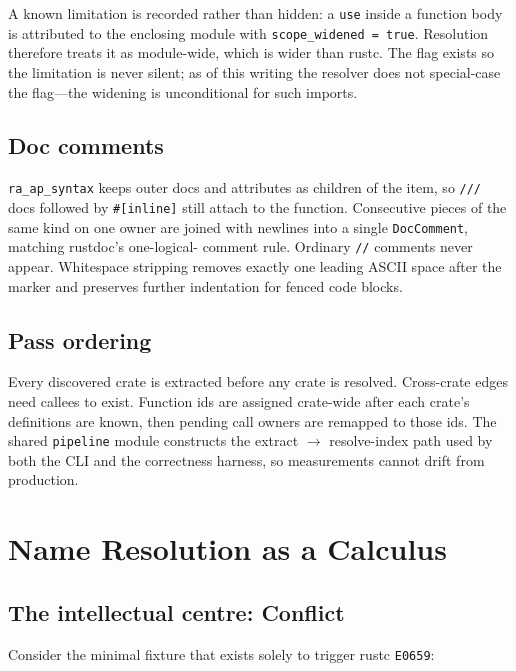 \documentclass[11pt,a4paper,oneside]{report}
\begin{document}
A known limitation is recorded rather than hidden: a \texttt{use} inside a
function body is attributed to the enclosing module with
\texttt{scope\_widened = true}. Resolution therefore treats it as module-wide,
which is wider than rustc. The flag exists so the limitation is never silent;
as of this writing the resolver does not special-case the flag---the widening
is unconditional for such imports.

\section{Doc comments}

\texttt{ra\_ap\_syntax} keeps outer docs and attributes as children of the
item, so \texttt{///} docs followed by \texttt{\#[inline]} still attach to the
function. Consecutive pieces of the same kind on one owner are joined with
newlines into a single \texttt{DocComment}, matching rustdoc's one-logical-
comment rule. Ordinary \texttt{//} comments never appear. Whitespace stripping
removes exactly one leading ASCII space after the marker and preserves further
indentation for fenced code blocks.

\section{Pass ordering}

Every discovered crate is extracted before any crate is resolved. Cross-crate
edges need callees to exist. Function ids are assigned crate-wide after each
crate's definitions are known, then pending call owners are remapped to those
ids. The shared \texttt{pipeline} module constructs the extract $\rightarrow$
resolve-index path used by both the CLI and the correctness harness, so
measurements cannot drift from production.

\chapter{Name Resolution as a Calculus}
\label{ch:resolve}

\section{The intellectual centre: Conflict}

Consider the minimal fixture that exists solely to trigger rustc
\texttt{E0659}:
\end{document}
